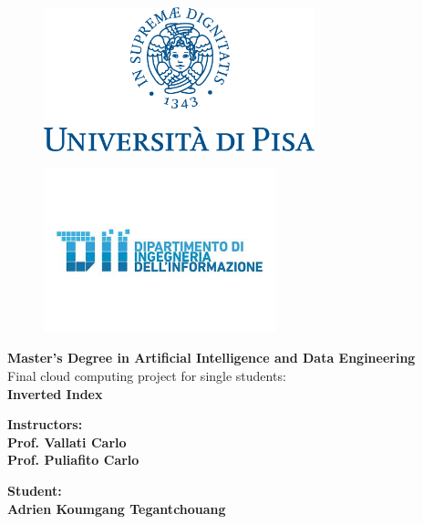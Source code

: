 
\begin{titlepage} %
\begin{figure}[t] %
    \centering\includegraphics[width=0.70\textwidth]{marchio_unipi_pant541}\label{fig:figure-first-page}
\end{figure}

\begin{figure}[t] %
    \centering\includegraphics[width=0.60\textwidth]{DII Logo}\label{fig:figure-first-page-2}
\end{figure}

\vspace{5mm}

\begin{Large}
 \begin{center}
	\textbf{Master's Degree in Artificial Intelligence and Data Engineering\\}
	\vspace{7mm}
    {\Large{Final cloud computing project for single students:}}\\
	\vspace{2mm}
	{\LARGE{\textbf{Inverted Index}}}
\end{center}
\end{Large}

\vspace{10mm}

\begin{minipage}[t]{0.47\textwidth}
	{\large{\textbf{Instructors:\\ Prof. Vallati Carlo \\ Prof. Puliafito Carlo}}}
\end{minipage}
\hfill
\begin{minipage}[t]{0.47\textwidth}\raggedleft
	{\large{\textbf{Student: \\ Adrien Koumgang Tegantchouang}}}
\end{minipage}

\vspace{20mm}


\end{titlepage}
